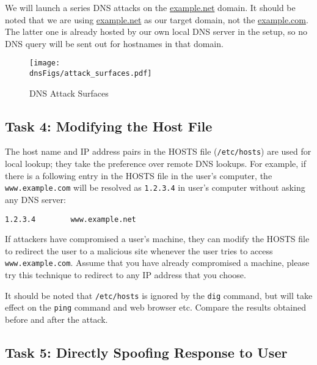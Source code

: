 We will launch a series DNS attacks on the \url{example.net} domain.  
It should be noted that we are using \url{example.net} as our target domain, not 
the \url{example.com}. The latter one is already hosted by our own
local DNS server in the setup, so no DNS query will be 
sent out for hostnames in that domain.



\begin{figure}[tb]
\centering
\texttt{[image: \\dnsFigs/attack\_surfaces.pdf]}
\caption{DNS Attack Surfaces}
\label{dns:fig:attack_surface}
\end{figure}



\subsection{Task 4: Modifying the Host File}


The host name and IP address pairs in the HOSTS file (\texttt{/etc/hosts}) 
are used for local lookup; they take the preference over 
remote DNS lookups. For example, if there is a following 
entry in the HOSTS file in the user's computer, 
the \texttt{www.example.com} will be resolved as \texttt{1.2.3.4} in 
user's computer without asking any DNS server:

\begin{verbatim}
1.2.3.4        www.example.net
\end{verbatim}

If attackers have compromised a user's machine, they can 
modify the HOSTS file to redirect the user to a malicious site
whenever the user tries to access {\tt www.example.com}. Assume that you have 
already compromised a machine, please try this technique to redirect
\wwwbank to any IP address that you choose.

It should be noted that \texttt{/etc/hosts} is ignored by the {\tt dig} command, 
but will take effect on the \texttt{ping} command and web browser etc.
Compare the results obtained before and after the attack. 



\subsection{Task 5: Directly Spoofing Response to User}



